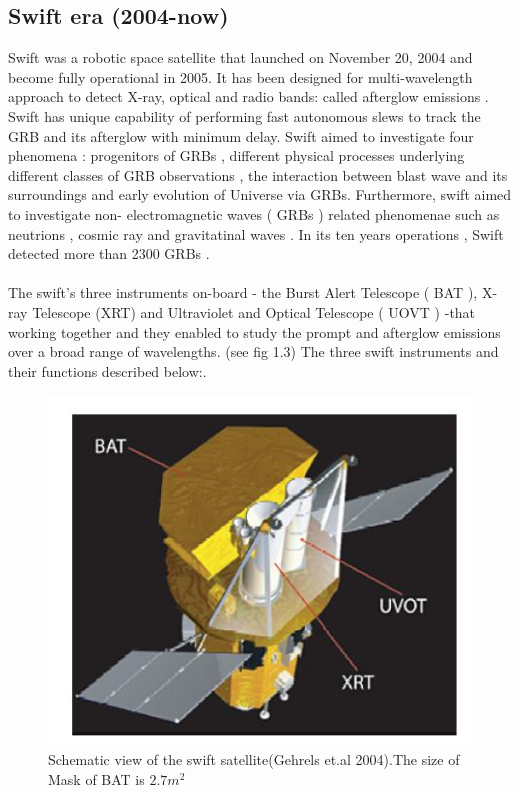 \subsection{ Swift era  (2004-now) }
 Swift was a robotic space   satellite that  launched  on November 20, 2004 and become fully  operational in 2005. It has  been designed for  multi-wavelength approach to detect  X-ray, optical and radio bands: called afterglow emissions .  Swift has unique  capability of performing  fast  autonomous  slews to  track the  GRB  and  its  afterglow  with  minimum  delay. Swift aimed  to  investigate four   phenomena : progenitors  of  GRBs , different physical  processes  underlying  different  classes of GRB  observations , the  interaction  between  blast wave  and  its  surroundings  and   early  evolution  of  Universe via  GRBs. Furthermore, swift  aimed  to investigate  non- electromagnetic waves ( GRBs ) related  phenomenae  such  as  neutrions , cosmic ray  and  gravitatinal  waves . In its ten years  operations , Swift  detected  more  than 2300 GRBs \citep{4} \citep{6}. \\\\
The swift's  three instruments on-board - the  Burst Alert Telescope ( BAT ),  X-ray Telescope (XRT) and   Ultraviolet and  Optical Telescope ( UOVT ) -that working together and they  enabled to study  the  prompt and afterglow emissions  over a broad range of wavelengths. (see fig 1.3) The  three  swift instruments and their functions described below:\citep{8}\cite{9}.\\
\begin{figure}[h]
\begin{center}
\includegraphics[scale=0.4]{Figures/fig3.png}
\caption{Schematic view of the swift satellite(Gehrels et.al 2004).The size of Mask of BAT is $2.7m^{2}$  \citep{7}} 
\end{center}
\end{figure}
